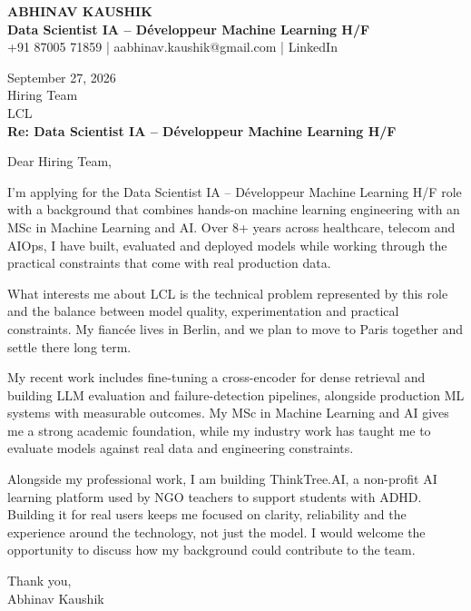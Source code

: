 \documentclass[10pt,a4paper]{article}
\begin{document}
\begin{center}
{\Large\bfseries ABHINAV KAUSHIK}\\[2pt]
{\bfseries Data Scientist IA – Développeur Machine Learning H/F}\\[2pt]
+91 87005 71859 \quad | \quad aabhinav.kaushik@gmail.com \quad | \quad LinkedIn
\end{center}
\vspace{8pt}
September 27, 2026\\[6pt]
Hiring Team\\
LCL\\[4pt]
\textbf{Re: Data Scientist IA – Développeur Machine Learning H/F}

Dear Hiring Team,

I’m applying for the Data Scientist IA – Développeur Machine Learning H/F role with a background that combines hands-on machine learning engineering with an MSc in Machine Learning and AI. Over 8+ years across healthcare, telecom and AIOps, I have built, evaluated and deployed models while working through the practical constraints that come with real production data.

What interests me about LCL is the technical problem represented by this role and the balance between model quality, experimentation and practical constraints. My fiancée lives in Berlin, and we plan to move to Paris together and settle there long term.

My recent work includes fine-tuning a cross-encoder for dense retrieval and building LLM evaluation and failure-detection pipelines, alongside production ML systems with measurable outcomes. My MSc in Machine Learning and AI gives me a strong academic foundation, while my industry work has taught me to evaluate models against real data and engineering constraints.

Alongside my professional work, I am building ThinkTree.AI, a non-profit AI learning platform used by NGO teachers to support students with ADHD. Building it for real users keeps me focused on clarity, reliability and the experience around the technology, not just the model. I would welcome the opportunity to discuss how my background could contribute to the team.

Thank you,\\
Abhinav Kaushik
\end{document}
